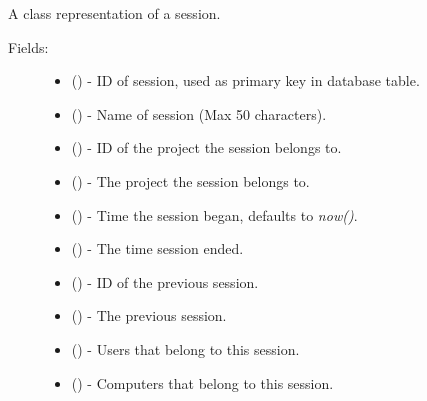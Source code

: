 \documentclass[letterpaper,10pt,english]{sphinxmanual}
\begin{document}

\begin{fulllineitems}
\label{models:models.Session}
A class representation of a session.
\begin{description}
\item[{Fields:}] \leavevmode\begin{itemize}
\item {} 
        ()        - ID of session, used as primary key in database table.

\item {} 
        ()        - Name of session (Max 50 characters).

\item {} 
        ()        - ID of the project the session belongs to.

\item {} 
 ()        - The project the session belongs to.

\item {} 
        ()        - Time the session began, defaults to \emph{now()}.

\item {} 
        ()        - The time session ended.

\item {} 
        ()        - ID of the previous session.

\item {} 
        () - The previous session.

\item {} 
 ()        - Users that belong to this session.

\item {} 
 ()        - Computers that belong to this session.

\end{itemize}


\end{description}
\end{fulllineitems}
\end{document}
